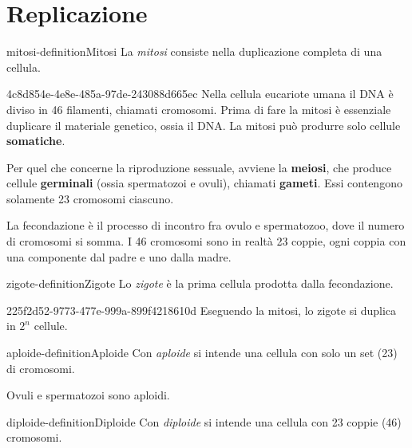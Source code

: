 \documentclass[preview]{standalone}
\begin{document}
\genpage

\section{Replicazione}

\begin{snippetdefinition}{mitosi-definition}{Mitosi}
    La \textit{mitosi} consiste nella duplicazione completa di una cellula.
\end{snippetdefinition}

\begin{snippet}{4c8d854e-4e8e-485a-97de-243088d665ec}
    Nella cellula eucariote umana il DNA è diviso in 46 filamenti, chiamati cromosomi.
    Prima di fare la mitosi è essenziale duplicare il materiale genetico, ossia il DNA.
    La mitosi può produrre solo cellule \textbf{somatiche}.

    Per quel che concerne la riproduzione sessuale,
    avviene la \textbf{meiosi}, che produce cellule \textbf{germinali}
    (ossia spermatozoi e ovuli), chiamati \textbf{gameti}.
    Essi contengono solamente 23 cromosomi ciascuno.

    La fecondazione è il processo di incontro fra ovulo e spermatozoo,
    dove il numero di cromosomi si somma.
    I 46 cromosomi sono in realtà 23 coppie, ogni coppia con una componente dal padre e uno dalla madre.
\end{snippet}

\begin{snippetdefinition}{zigote-definition}{Zigote}
    Lo \textit{zigote} è la prima cellula prodotta dalla fecondazione.
\end{snippetdefinition}

\begin{snippet}{225f2d52-9773-477e-999a-899f4218610d}
    Eseguendo la mitosi, lo zigote si duplica in \(2^n\) cellule.
\end{snippet}

\begin{snippetdefinition}{aploide-definition}{Aploide}
    Con \textit{aploide} si intende una cellula con solo un set (23) di cromosomi.
\end{snippetdefinition}

\begin{plainhtml}
    Ovuli e spermatozoi sono aploidi.
\end{plainhtml}

\begin{snippetdefinition}{diploide-definition}{Diploide}
    Con \textit{diploide} si intende una cellula con 23 coppie (46) cromosomi.
\end{snippetdefinition}
\end{document}
